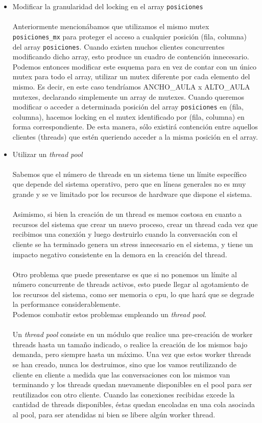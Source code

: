 \begin{itemize}
  \item Modificar la granularidad del locking en el array \texttt{posiciones}\\\\
  Anteriormente mencionábamos que utilizamos el mismo mutex \texttt{posiciones\_mx} para proteger el acceso a cualquier posición (fila, columna) del array \texttt{posiciones}. Cuando existen muchos clientes concurrentes modificando dicho array, esto produce un cuadro de contención innecesario. Podemos entonces modificar este esquema para en vez de contar con un único mutex para todo el array, utilizar un mutex diferente por cada elemento del mismo. Es decir, en este caso tendríamos ANCHO\_AULA x ALTO\_AULA mutexes, declarando simplemente un array de mutexes. Cuando queremos modificar o acceder a determinada posición del array \texttt{posiciones} en (fila, columna), hacemos locking en el mutex identificado por (fila, columna) en forma correspondiente. De esta manera, sólo existirá contención entre aquellos clientes (threads) que estén queriendo acceder a la misma posición en el array.\\
  \item Utilizar un \textit{thread pool}\\\\
  Sabemos que el número de threads en un sistema tiene un límite específico que depende del sistema operativo, pero que en líneas generales no es muy grande y se ve limitado por los recursos de hardware que dispone el sistema.\\\\
Asimismo, si bien la creación de un thread es memos costosa en cuanto a recursos del sistema que crear un nuevo proceso, crear un thread cada vez que recibimos una conexión y luego destruirlo cuando la conversación con el cliente se ha terminado genera un stress innecesario en el sistema, y tiene un impacto negativo consistente en la demora en la creación del thread. \\\\
Otro problema que puede presentarse es que si no ponemos un límite al número concurrente de threads activos, esto puede llegar al agotamiento de los recursos del sistema, como ser memoria o cpu, lo que hará que se degrade la performance considerablemente.\\ 
Podemos combatir estos problemas empleando un \textit{thread pool}.\\\\
Un \textit{thread pool} consiste en un módulo que realice una pre-creación de worker threads hasta un tamaño indicado, o realice la creación de los mismos bajo demanda, pero siempre hasta un máximo. Una vez que estos worker threads se han creado, nunca los destruimos, sino que los vamos reutilizando de cliente en cliente a medida que las conversaciones con los mismos van terminando y los threads quedan nuevamente disponibles en el pool para ser reutilizados con otro cliente. Cuando las conexiones recibidas excede la cantidad de threads disponibles, éstas quedan encoladas en una cola asociada al pool, para ser atendidas ni bien se libere algún worker thread.
\end{itemize}


